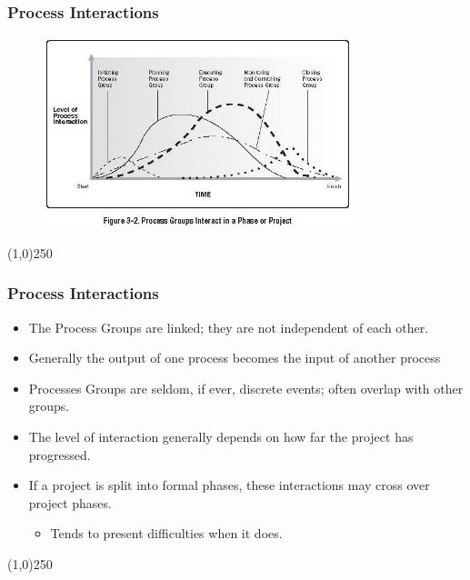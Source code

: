 \begin{frame}
\frametitle{Process Interactions}
 \begin{figure}
 	\centering
 		\includegraphics[width = 9cm]{images/Fig3-2.jpg}
 	\label{fig:3-2}
 \end{figure}
\end{frame}
\begin{center}\line(1,0){250}\end{center}



\begin{frame}
\frametitle{Process Interactions}
\begin{itemize}
	\item The Process Groups are linked; they are not independent of each other.\\
	\item Generally the output of one process becomes the input of another process\\
	\item Processes Groups are seldom, if ever, discrete events; often overlap with other groups.\\
	\item The level of interaction generally depends on how far the project has progressed.\\
	\item If a project is split into formal phases, these interactions may cross over project phases. \\ 
		\begin{itemize}
			\item Tends to present difficulties when it does. 
		\end{itemize}
\end{itemize}
\end{frame}
\begin{center}\line(1,0){250}\end{center}



